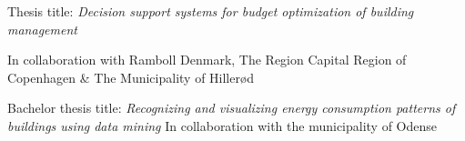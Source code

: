 
Thesis title: \emph{Decision support systems for budget optimization of building management}

In collaboration with Ramboll Denmark, The Region Capital Region of Copenhagen \& The Municipality of Hillerød

\divider

Bachelor thesis title: \emph{Recognizing and visualizing energy consumption patterns of buildings using data mining}
In collaboration with the municipality of Odense
\divider